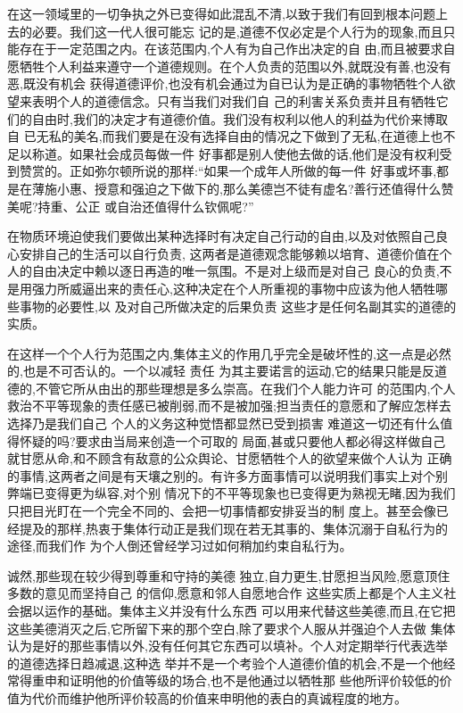 ﻿\documentclass[12pt]{article}
\begin{document}
在这一领域里的一切争执之外已变得如此混乱不清,以致于我们有回到根本问题上去的必要。我们这一代人很可能忘
记的是,道德不仅必定是个人行为的现象,而且只能存在于一定范围之内。在该范围内,个人有为自己作出决定的自
由,而且被要求自愿牺牲个人利益来遵守一个道德规则。在个人负责的范围以外,就既没有善,也没有恶,既没有机会
获得道德评价,也没有机会通过为自已认为是正确的事物牺牲个人欲望来表明个人的道德信念。只有当我们对我们自
己的利害关系负责并且有牺牲它们的自由时,我们的决定才有道德价值。我们没有权利以他人的利益为代价来博取自
已无私的美名,而我们要是在没有选择自由的情况之下做到了无私,在道德上也不足以称道。如果社会成员每做一件
好事都是别人使他去做的话,他们是没有权利受到赞赏的。正如弥尔顿所说的那样:``如果一个成年人所做的每一件
好事或坏事,都是在薄施小惠、授意和强迫之下做下的,那么美德岂不徒有虚名?善行还值得什么赞美呢?持重、公正
或自治还值得什么钦佩呢?''

在物质环境迫使我们要做出某种选择时有决定自己行动的自由,以及对依照自己良心安排自己的生活可以自行负责,
这两者是道德观念能够赖以培育、道德价值在个人的自由决定中赖以逐日再造的唯一氛围。不是对上级而是对自己
良心的负责,不是用强力所威逼出来的责任心,这种决定在个人所重视的事物中应该为他人牺牲哪些事物的必要性,以
及对自己所做决定的后果负责 \myrule 这些才是任何名副其实的道德的实质。

在这样一个个人行为范围之内,集体主义的作用几乎完全是破坏性的,这一点是必然的,也是不可否认的。一个以减轻
责任 为其主要诺言的运动,它的结果只能是反道德的,不管它所从由出的那些理想是多么崇高。在我们个人能力许可
的范围内,个人救治不平等现象的责任感已被削弱,而不是被加强;担当责任的意愿和了解应怎样去选择乃是我们自己
个人的义务这种觉悟都显然已受到损害 \myrule 难道这一切还有什么值得怀疑的吗?要求由当局来创造一个可取的
局面,甚或只要他人都必得这样做自己就甘愿从命,和不顾含有敌意的公众舆论、甘愿牺牲个人的欲望来做个人认为
正确的事情,这两者之间是有天壤之别的。有许多方面事情可以说明我们事实上对个别弊端已变得更为纵容,对个别
情况下的不平等现象也已变得更为熟视无睹,因为我们只把目光盯在一个完全不同的、会把一切事情都安排妥当的制
度上。甚至会像已经提及的那样,热衷于集体行动正是我们现在若无其事的、集体沉溺于自私行为的途径,而我们作
为个人倒还曾经学习过如何稍加约束自私行为。

诚然,那些现在较少得到尊重和守持的美德 \myrule 独立,自力更生,甘愿担当风险,愿意顶住多数的意见而坚持自己
的信仰,愿意和邻人自愿地合作 \myrule 这些实质上都是个人主义社会据以运作的基础。集体主义并没有什么东西
可以用来代替这些美德,而且,在它把这些美德消灭之后,它所留下来的那个空白,除了要求个人服从并强迫个人去做
集体认为是好的那些事情以外,没有任何其它东西可以填补。个人对定期举行代表选举的道德选择日趋减退,这种选
举并不是一个考验个人道德价值的机会,不是一个他经常得重申和证明他的价值等级的场合,也不是他通过以牺牲那
些他所评价较低的价值为代价而维护他所评价较高的价值来申明他的表白的真诚程度的地方。
\end{document}
